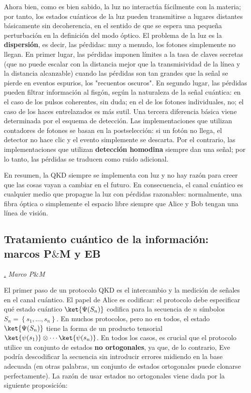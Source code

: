 \documentclass[a4paper,11pt]{book} %
\numberwithin{equation}{chapter}
\def\lch{\left\{}
\def\rch{\right\}}
\def\subsubiContadorIt{\par\addtocounter{subsubsection}{1}\underline{\it\thesubsubsection.}\hskip0.5cm \setcounter{subsubsubsectionIt}{0}}
\newcommand{\SubsubiIt}[1]{
		\subsubiContadorIt \textit{#1}
	}
\newcounter{subsubsubsectionIt}[subsubsection]
\begin{document}
Ahora bien, como es bien sabido, la luz no interactúa fácilmente con la materia; por tanto, los estados cuánticos de la luz pueden transmitirse a lugares distantes básicamente sin decoherencia, en el sentido de que se espera una pequeña perturbación en la definición del modo óptico. El problema de la luz es la \textbf{dispersión}, es decir, las pérdidas: muy a menudo, los fotones simplemente no llegan. En primer lugar, las pérdidas imponen límites a la tasa de claves secretas (que no puede escalar con la distancia mejor que la transmisividad de la línea y la distancia alcanzable) cuando las pérdidas son tan grandes que la señal se pierde en eventos espurios, los "recuentos oscuros". En segundo lugar, las pérdidas pueden filtrar información al fisgón, según la naturaleza de la señal cuántica: en el caso de los pulsos coherentes, sin duda; en el de los fotones individuales, no; el caso de los haces entrelazados es más sutil. Una tercera diferencia básica viene determinada por el esquema de detección. Las implementaciones que utilizan contadores de fotones se basan en la postselección: si un fotón no llega, el detector no hace clic y el evento simplemente se descarta. Por el contrario, las implementaciones que utilizan \textbf{detección homodina} siempre dan una señal; por lo tanto, las pérdidas se traducen como ruido adicional.

En resumen, la QKD siempre se implementa con luz y no hay razón para creer que las cosas vayan a cambiar en el futuro. En consecuencia, el canal cuántico es cualquier medio que propague la luz con pérdidas razonables: normalmente, una fibra óptica o simplemente el espacio libre siempre que Alice y Bob tengan una línea de visión.
		
		\subsection{Tratamiento cuántico de la información: marcos P$\&$M y EB}
		
			\SubsubiIt{Marco P$\&$M}
			
El primer paso de un protocolo QKD es el intercambio y la medición de señales en el canal cuántico. El papel de Alice es codificar: el protocolo debe especificar qué estado cuántico $\ket{\Psi(S_n)}$ codifica para la secuencia de $n$ símbolos $S_n = \lch s_1, \dots, s_n \rch$. En muchos protocolos, pero no en todos, el estado $\ket{\Psi(S_n)}$ tiene la forma de un producto tensorial $\ket{\psi(s_1)} \otimes \cdots \ket{\psi(s_n)}$.  En todos los casos, es crucial que el protocolo utilice un conjunto de estados \textbf{no ortogonales}, ya que, de lo contrario, Eve podría descodificar la secuencia sin introducir errores midiendo en la base adecuada (en otras palabras, un conjunto de estados ortogonales puede clonarse perfectamente). La razón de usar estados no ortogonales viene dada por la siguiente proposición:
\end{document}
